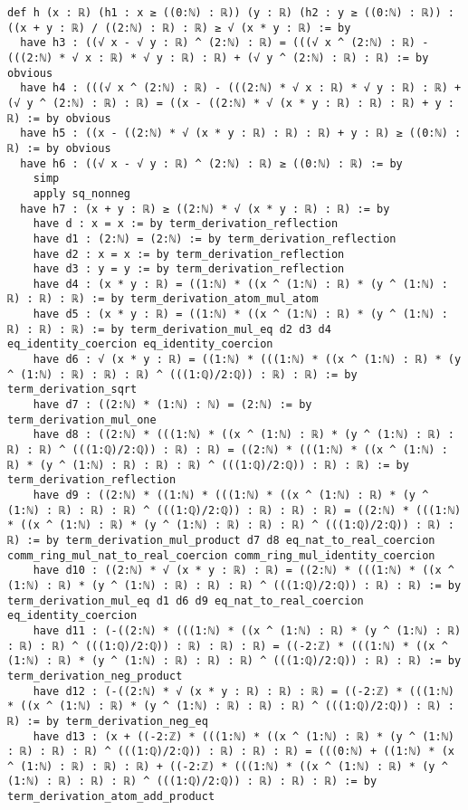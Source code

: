 \documentclass{article}
\begin{document}
\begin{tcolorbox}[colback=white!10, width=\linewidth]
\begin{lstlisting}[language=Lean4]
def h (x : ℝ) (h1 : x ≥ ((0:ℕ) : ℝ)) (y : ℝ) (h2 : y ≥ ((0:ℕ) : ℝ)) : ((x + y : ℝ) / ((2:ℕ) : ℝ) : ℝ) ≥ √ (x * y : ℝ) := by
  have h3 : ((√ x - √ y : ℝ) ^ (2:ℕ) : ℝ) = (((√ x ^ (2:ℕ) : ℝ) - (((2:ℕ) * √ x : ℝ) * √ y : ℝ) : ℝ) + (√ y ^ (2:ℕ) : ℝ) : ℝ) := by obvious
  have h4 : (((√ x ^ (2:ℕ) : ℝ) - (((2:ℕ) * √ x : ℝ) * √ y : ℝ) : ℝ) + (√ y ^ (2:ℕ) : ℝ) : ℝ) = ((x - ((2:ℕ) * √ (x * y : ℝ) : ℝ) : ℝ) + y : ℝ) := by obvious
  have h5 : ((x - ((2:ℕ) * √ (x * y : ℝ) : ℝ) : ℝ) + y : ℝ) ≥ ((0:ℕ) : ℝ) := by obvious
  have h6 : ((√ x - √ y : ℝ) ^ (2:ℕ) : ℝ) ≥ ((0:ℕ) : ℝ) := by
    simp
    apply sq_nonneg
  have h7 : (x + y : ℝ) ≥ ((2:ℕ) * √ (x * y : ℝ) : ℝ) := by
    have d : x = x := by term_derivation_reflection
    have d1 : (2:ℕ) = (2:ℕ) := by term_derivation_reflection
    have d2 : x = x := by term_derivation_reflection
    have d3 : y = y := by term_derivation_reflection
    have d4 : (x * y : ℝ) = ((1:ℕ) * ((x ^ (1:ℕ) : ℝ) * (y ^ (1:ℕ) : ℝ) : ℝ) : ℝ) := by term_derivation_atom_mul_atom
    have d5 : (x * y : ℝ) = ((1:ℕ) * ((x ^ (1:ℕ) : ℝ) * (y ^ (1:ℕ) : ℝ) : ℝ) : ℝ) := by term_derivation_mul_eq d2 d3 d4 eq_identity_coercion eq_identity_coercion
    have d6 : √ (x * y : ℝ) = ((1:ℕ) * (((1:ℕ) * ((x ^ (1:ℕ) : ℝ) * (y ^ (1:ℕ) : ℝ) : ℝ) : ℝ) ^ (((1:ℚ)/2:ℚ)) : ℝ) : ℝ) := by term_derivation_sqrt
    have d7 : ((2:ℕ) * (1:ℕ) : ℕ) = (2:ℕ) := by term_derivation_mul_one
    have d8 : ((2:ℕ) * (((1:ℕ) * ((x ^ (1:ℕ) : ℝ) * (y ^ (1:ℕ) : ℝ) : ℝ) : ℝ) ^ (((1:ℚ)/2:ℚ)) : ℝ) : ℝ) = ((2:ℕ) * (((1:ℕ) * ((x ^ (1:ℕ) : ℝ) * (y ^ (1:ℕ) : ℝ) : ℝ) : ℝ) ^ (((1:ℚ)/2:ℚ)) : ℝ) : ℝ) := by term_derivation_reflection
    have d9 : ((2:ℕ) * ((1:ℕ) * (((1:ℕ) * ((x ^ (1:ℕ) : ℝ) * (y ^ (1:ℕ) : ℝ) : ℝ) : ℝ) ^ (((1:ℚ)/2:ℚ)) : ℝ) : ℝ) : ℝ) = ((2:ℕ) * (((1:ℕ) * ((x ^ (1:ℕ) : ℝ) * (y ^ (1:ℕ) : ℝ) : ℝ) : ℝ) ^ (((1:ℚ)/2:ℚ)) : ℝ) : ℝ) := by term_derivation_mul_product d7 d8 eq_nat_to_real_coercion comm_ring_mul_nat_to_real_coercion comm_ring_mul_identity_coercion
    have d10 : ((2:ℕ) * √ (x * y : ℝ) : ℝ) = ((2:ℕ) * (((1:ℕ) * ((x ^ (1:ℕ) : ℝ) * (y ^ (1:ℕ) : ℝ) : ℝ) : ℝ) ^ (((1:ℚ)/2:ℚ)) : ℝ) : ℝ) := by term_derivation_mul_eq d1 d6 d9 eq_nat_to_real_coercion eq_identity_coercion
    have d11 : (-((2:ℕ) * (((1:ℕ) * ((x ^ (1:ℕ) : ℝ) * (y ^ (1:ℕ) : ℝ) : ℝ) : ℝ) ^ (((1:ℚ)/2:ℚ)) : ℝ) : ℝ) : ℝ) = ((-2:ℤ) * (((1:ℕ) * ((x ^ (1:ℕ) : ℝ) * (y ^ (1:ℕ) : ℝ) : ℝ) : ℝ) ^ (((1:ℚ)/2:ℚ)) : ℝ) : ℝ) := by term_derivation_neg_product
    have d12 : (-((2:ℕ) * √ (x * y : ℝ) : ℝ) : ℝ) = ((-2:ℤ) * (((1:ℕ) * ((x ^ (1:ℕ) : ℝ) * (y ^ (1:ℕ) : ℝ) : ℝ) : ℝ) ^ (((1:ℚ)/2:ℚ)) : ℝ) : ℝ) := by term_derivation_neg_eq
    have d13 : (x + ((-2:ℤ) * (((1:ℕ) * ((x ^ (1:ℕ) : ℝ) * (y ^ (1:ℕ) : ℝ) : ℝ) : ℝ) ^ (((1:ℚ)/2:ℚ)) : ℝ) : ℝ) : ℝ) = (((0:ℕ) + ((1:ℕ) * (x ^ (1:ℕ) : ℝ) : ℝ) : ℝ) + ((-2:ℤ) * (((1:ℕ) * ((x ^ (1:ℕ) : ℝ) * (y ^ (1:ℕ) : ℝ) : ℝ) : ℝ) ^ (((1:ℚ)/2:ℚ)) : ℝ) : ℝ) : ℝ) := by term_derivation_atom_add_product

\end{lstlisting}
\end{tcolorbox}
\end{document}
